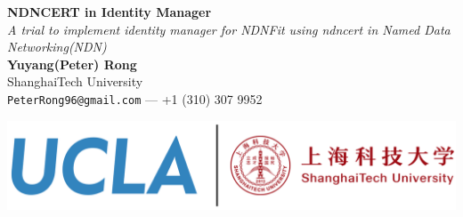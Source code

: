 \documentclass[a0,portrait]{poster}
\begin{document}


\begin{minipage}[b]{0.6\linewidth}
\veryHuge \color{NavyBlue} \textbf{NDNCERT in Identity Manager} \color{Black}\\ %
\Huge\textit{A trial to implement identity manager for NDNFit using ndncert in Named Data Networking(NDN)}\\[2cm] %
\huge \textbf{Yuyang(Peter) Rong}\\[0.5cm] %
\huge ShanghaiTech University\\[0.4cm] %
\Large \texttt{PeterRong96@gmail.com} --- +1 (310) 307 9952\\
\end{minipage}
%
\begin{minipage}[b]{0.4\linewidth}
\includegraphics[width=\linewidth]{logo.png}\\
\end{minipage}

\vspace{1cm} %

\end{document}
